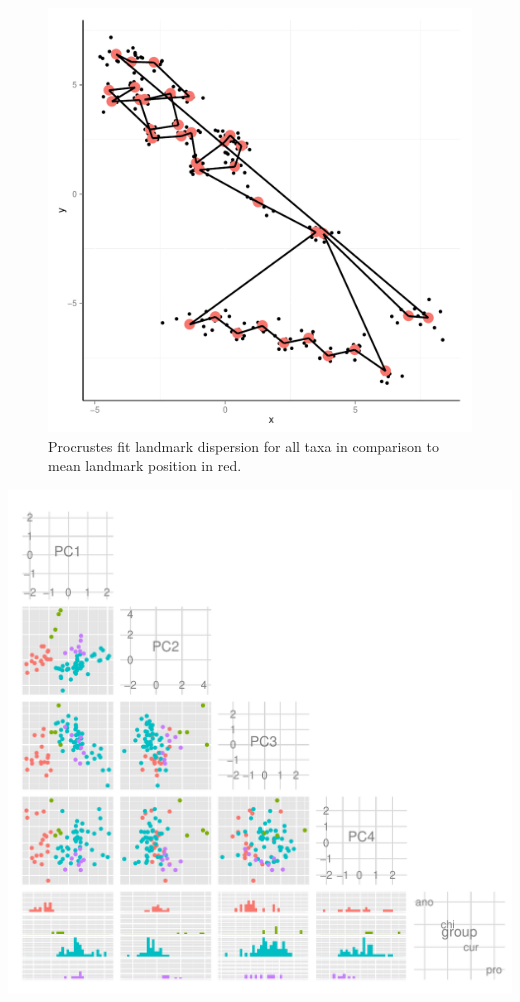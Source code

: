\documentclass{article}\usepackage{graphicx, color}
\makeatletter
\def\maxwidth{ %
  \ifdim\Gin@nat@width>\linewidth
    \linewidth
  \else
    \Gin@nat@width
  \fi
}
\newenvironment{knitrout}{}{} %
\makeatother
\begin{document}
\begin{figure}[p]
  \centering
  \includegraphics[height = 0.4\textheight, keepaspectratio = true]{figure/pls-fits3}
  \caption{Procrustes fit landmark dispersion for all taxa in comparison to mean landmark position in red.}
  \label{fig:fish-fit}
\end{figure}

\begin{knitrout}
\color{fgcolor}
\includegraphics[width=\maxwidth]{figure/pca-plots} 

\end{knitrout}
\end{document}

